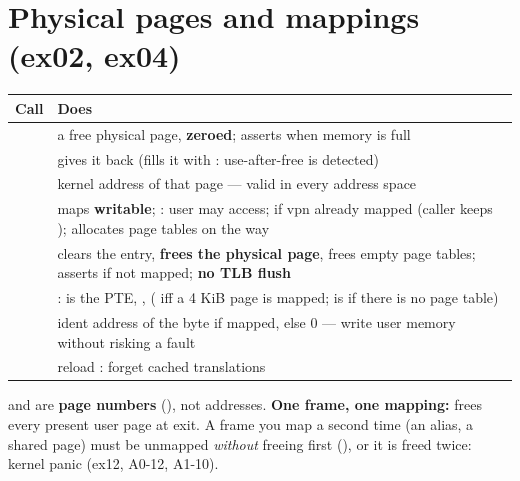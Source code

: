 \section{Physical pages and mappings (ex02, ex04)}
\label{sec:mapping}

\begin{center}
\footnotesize
\begin{tabular}{L{6.6cm}L{8.8cm}}
\toprule
\textbf{Call} & \textbf{Does} \\
\midrule
{} & a free physical page, \textbf{zeroed}; asserts when memory is full \\
 & gives it back (fills it with : use-after-free is detected) \\
 & kernel address of that page --- valid in every address space \\
 & maps \textbf{writable}; : user may access;  if vpn already mapped (caller keeps ); allocates page tables on the way \\
 & clears the entry, \textbf{frees the physical page}, frees empty page tables; asserts if not mapped; \textbf{no TLB flush} \\
 & :  is the PTE, ,  ( iff a 4 KiB page is mapped;  is  if there is no page table) \\
 & ident address of the byte  if mapped, else 0 --- write user memory without risking a fault \\
 & reload : forget cached translations \\
\bottomrule
\end{tabular}
\end{center}

 and  are \textbf{page numbers} (), not addresses.
\textbf{One frame, one mapping:}  frees every present user page
at exit. A frame you map a second time (an alias, a shared page) must be unmapped
\emph{without} freeing first (), or it is freed twice: kernel panic
 (ex12, A0-12, A1-10).

